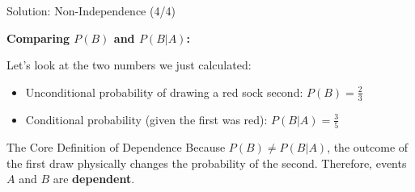 \begin{frame}{Solution: Non-Independence (4/4)}
    \begin{solution}
        \textbf{Comparing $P(B)$ and $P(B|A)$:}
        
        Let's look at the two numbers we just calculated:
        \begin{itemize}
            \item Unconditional probability of drawing a red sock second: $P(B) = \frac{2}{3}$
            \item Conditional probability (given the first was red): $P(B|A) = \frac{3}{5}$
        \end{itemize}

        \pause \vspace{0.4cm}
        
        \begin{alertblock}{The Core Definition of Dependence}
            Because $P(B) \neq P(B|A)$, the outcome of the first draw physically changes the probability of the second. Therefore, events $A$ and $B$ are \textbf{dependent}.
        \end{alertblock}

    \end{solution}
\end{frame}

